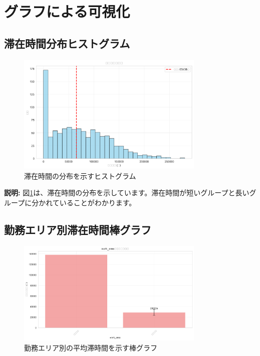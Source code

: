 \documentclass[11pt,a4paper]{article}
\begin{document}
\section{グラフによる可視化}

\subsection{滞在時間分布ヒストグラム}

\begin{figure}[H]
    \centering
    \includegraphics[width=0.8\textwidth]{images/duration_histogram.png}
    \caption{滞在時間の分布を示すヒストグラム}
    \label{fig:duration_histogram}
\end{figure}

\textbf{説明:}
図\ref{fig:duration_histogram}は、滞在時間の分布を示しています。滞在時間が短いグループと長いグループに分かれていることがわかります。

\subsection{勤務エリア別滞在時間棒グラフ}

\begin{figure}[H]
    \centering
    \includegraphics[width=0.8\textwidth]{images/work_area_bar_chart.png}
    \caption{勤務エリア別の平均滞時間を示す棒グラフ}
    \label{fig:work_area_bar_chart}
\end{figure}
\end{document}
